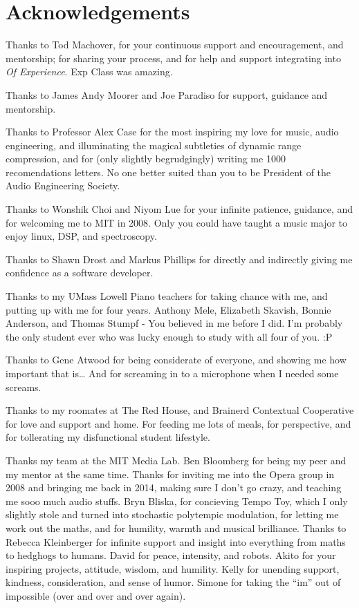 \chapter*{Acknowledgements}
\label{ch:acknowledgements}


\begin{fullwidth}

  Thanks to Tod Machover, for your continuous support and
  encouragement, and mentorship; for sharing your process, and for
  help and support integrating \thesis into \textit{Of
    Experience}. Exp Class was amazing.

Thanks to James Andy Moorer and Joe Paradiso for support, guidance
and mentorship.

Thanks to Professor Alex Case for the most inspiring my love for
music, audio engineering, and illuminating the magical subtleties of
dynamic range compression, and for (only slightly begrudgingly)
writing me 1000 recomendations letters. No one better suited than you
to be President of the Audio Engineering Society.

Thanks to Wonshik Choi and Niyom Lue for your infinite patience,
guidance, and for welcoming me to MIT in 2008. Only you could have
taught a music major to enjoy linux, DSP, and spectroscopy.

Thanks to Shawn Drost and Markus Phillips for directly and indirectly
giving me confidence as a software developer.

Thanks to my UMass Lowell Piano teachers for taking chance with me,
and putting up with me for four years. Anthony Mele, Elizabeth
Skavish, Bonnie Anderson, and Thomas Stumpf - You believed in me
before I did. I'm probably the only student ever who was lucky enough
to study with all four of you. :P

Thanks to Gene Atwood for being considerate of everyone, and showing
me how important that is\ldots{} And for screaming in to a microphone when
I needed some screams.

Thanks to my roomates at The Red House, and Brainerd Contextual
Cooperative for love and support and home. For feeding me lots of
meals, for perspective, and for tollerating my disfunctional student
lifestyle.

Thanks my team at the MIT Media Lab. Ben Bloomberg for being my peer
and my mentor at the same time. Thanks for inviting me into the Opera
group in 2008 and bringing me back in 2014, making sure I don't go
crazy, and teaching me sooo much audio stuffs. Bryn Bliska, for
concieving Tempo Toy, which I only slightly stole and turned into
stochastic polytempic modulation, for letting me work out the maths,
and for humility, warmth and musical brilliance. Thanks to Rebecca
Kleinberger for infinite support and insight into everything from
maths to hedghogs to humans. David for peace, intensity, and
robots. Akito for your inspiring projects, attitude, wisdom, and
humility. Kelly for unending support, kindness, consideration, and
sense of humor. Simone for taking the ``im'' out of impossible (over
and over and over again).


\end{fullwidth}

